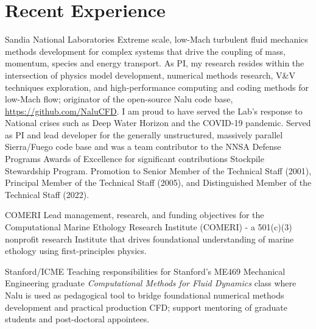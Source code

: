 \documentclass[letterpaper]{twentysecondcv_spd} %
\begin{document}
\section{Recent Experience}

\begin{twenty}

	 {Sandia National Laboratories} {Extreme scale, low-Mach turbulent fluid mechanics methods development for complex systems that drive the coupling of mass, momentum, species and energy transport. As PI, my research resides within the intersection of physics model development, numerical methods research, V\&V techniques exploration, and high-performance computing and coding methods for low-Mach flow; originator of the open-source Nalu code base, \underline{https://github.com/NaluCFD}. I am proud to have served the Lab's response to National crises such as Deep Water Horizon and the COVID-19 pandemic. Served as PI and lead developer for the generally unstructured, massively parallel Sierra/Fuego code base and was a team contributor to the NNSA Defense Programs Awards of Excellence for significant contributions Stockpile Stewardship Program. Promotion to Senior Member of the Technical Staff (2001), Principal Member of the Technical Staff (2005), and Distinguished Member of the Technical Staff (2022).}
	
	 {COMERI} {Lead management, research, and funding objectives for the Computational Marine Ethology Research Institute (COMERI) - a 501(c)(3) nonprofit research Institute that drives foundational understanding of marine ethology using first-principles physics.}
	
	 {Stanford/ICME} {Teaching responsibilities for Stanford's ME469 Mechanical Engineering graduate  \textit{Computational Methods for Fluid Dynamics} class where Nalu is used as pedagogical tool to bridge foundational numerical methods development and practical production CFD; support mentoring of graduate students and post-doctoral appointees.}
	
\end{twenty}


\newpage %
\end{document}
